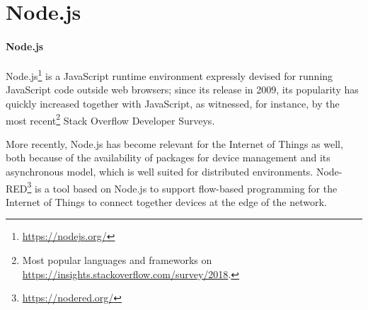 \section{Node.js}
\label{sec:node}


\paragraph{Node.js}
Node.js\footnote{\url{https://nodejs.org/}} is a JavaScript runtime environment expressly devised for running JavaScript code outside web browsers;
since its release in 2009, its popularity has quickly increased together with JavaScript, as witnessed, for instance, by the most recent\footnote{Most popular languages and frameworks on \url{https://insights.stackoverflow.com/survey/2018}.} Stack Overflow Developer Surveys. %

More recently, Node.js has become relevant for the Internet of Things as well, both because of the availability of packages for device management and its asynchronous model, which is well suited for distributed environments.
Node-RED\footnote{\url{https://nodered.org/}} is a tool based on Node.js to support flow-based programming for the Internet of Things to
connect together devices at the edge of the network.

